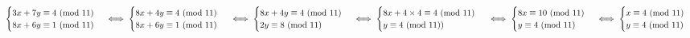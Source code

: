 \documentclass{article}
\begin{document}
		\justify
		\begin{math}
			\begin{cases}
				3x + 7y \equiv 4 \mbox{ (mod 11)}\\
				8x + 6y \equiv 1 \mbox{ (mod 11)}
			\end{cases}
			\iff
			\begin{cases}
				8x + 4y \equiv 4 \mbox{ (mod 11)}\\
				8x + 6y \equiv 1 \mbox{ (mod 11)}
			\end{cases}
			\\\\\\
			\iff
			\begin{cases}
				8x + 4y \equiv 4 \mbox{ (mod 11)}\\
				2y \equiv 8 \mbox{ (mod 11)}
			\end{cases}
			\iff
			\begin{cases}
				8x + 4\times4 \equiv 4 \mbox{ (mod 11)}\\
				y \equiv 4 \mbox{ (mod 11)})
			\end{cases}
			\\\\\\
			\iff
			\begin{cases}
				8x \equiv 10 \mbox{ (mod 11)}\\
				y \equiv 4 \mbox{ (mod 11)}
			\end{cases}
			\iff
			\begin{cases}
				x \equiv 4 \mbox{ (mod 11)}\\
				y \equiv 4 \mbox{ (mod 11)}
			\end{cases}
		\end{math}
	
\end{document}
